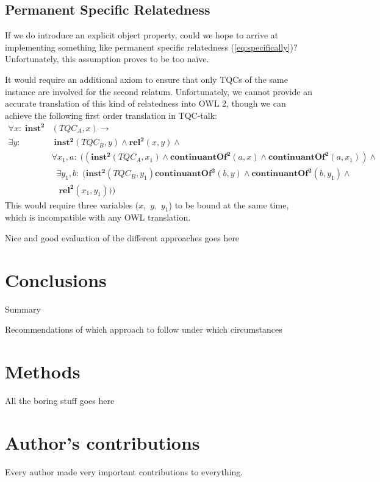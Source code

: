 \documentclass[10pt]{bmc_article}
\newcommand{\mirel}[1]{\ensuremath{\mathrm{\mathbf{#1}}}}
\newcommand{\mclass}[1]{\ensuremath{\mathit{#1}}}
\newcommand{\mrel}[2]{\mirel{#1^#2}}
\newcommand{\mrelb}[1]{\mrel{#1}{2}}
\newcommand{\TQC}[1]{\ensuremath{TQC_{\mclass{#1}}}}
\newenvironment{bmcformat}{\baselineskip20pt\sloppy\setboolean{publ}{false}}{\baselineskip20pt\sloppy}
\begin{document}
\begin{bmcformat}
\subsection*{Permanent Specific Relatedness}
If we do introduce an explicit object property, could we hope to arrive at
implementing something like permanent specific relatedness
(\ref{eq:specifically})? Unfortunately, this assumption proves to be too na\"ive.

It would require an additional axiom to ensure that only TQCs of the same instance are involved
for the second relatum. Unfortunately, we cannot provide an
accurate translation of this kind of relatedness into OWL 2, though we can
achieve the following first order translation in TQC-talk:
 \begin{equation}
\begin{split}
\forall x:\; \mrelb{inst}&(\TQC{A},x) \rightarrow \\
 \exists y:&\;\mrelb{inst}(\TQC{B},y) \wedge \mrelb{rel}(x,y)\wedge\\
 & \forall x_1,a:\; ((\mrelb{inst}(\TQC{A},x_1) \wedge 
\mrelb{continuantOf}(a,x) \wedge \mrelb{continuantOf}(a,x_1))\wedge\\
&\;\;\exists y_1,b:\;(\mrelb{inst}(\TQC{B},y_1) \mrelb{continuantOf}(b,y)  
\wedge \mrelb{continuantOf}(b,y_1) \wedge\\&\;\;\;\mrelb{rel}(x_1,y_1)))
\end{split}
\end{equation}
This would require three variables ($x$,~$y$,~$y_1$) to be bound at the same
time, which is incompatible with any OWL translation.


Nice and good evaluation of the different approaches goes here

\section*{Conclusions}

Summary

Recommendations of which approach to follow under which circumstances


\section*{Methods}

All the boring stuff goes here

\bigskip

\section*{Author's contributions}
Every author made very important contributions to everything. 


\end{bmcformat}
\end{document}
